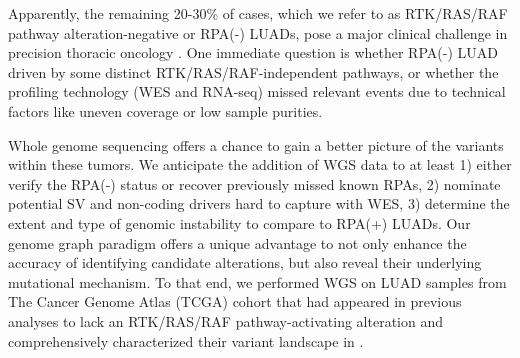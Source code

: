 \documentclass[phd,tocprelim]{cornell}
\begin{document}
Apparently, the remaining 20-30\% of cases, which we refer to as RTK/RAS/RAF pathway alteration-negative or RPA(-) LUADs, pose a major clinical challenge in precision thoracic oncology \cite{Campbell2016-xv}. One immediate question is whether RPA(-) LUAD driven by some distinct RTK/RAS/RAF-independent pathways, or whether the profiling technology (WES and RNA-seq) missed relevant events due to technical factors like uneven coverage or low sample purities. 

Whole genome sequencing offers a chance to gain a better picture of the variants within these tumors. We anticipate the addition of WGS data to at least 1) either verify the RPA(-) status or recover previously missed known RPAs, 2) nominate potential SV and non-coding drivers hard to capture with WES, 3) determine the extent and type of genomic instability to compare to RPA(+) LUADs. Our genome graph paradigm offers a unique advantage to not only enhance the accuracy of identifying candidate alterations, but also reveal their underlying mutational mechanism. To that end, we performed WGS on LUAD samples from The Cancer Genome Atlas (TCGA) cohort that had appeared in previous analyses to lack an RTK/RAS/RAF pathway-activating alteration \cite{Campbell2016-xv} and comprehensively characterized their variant landscape in .



\end{document}
